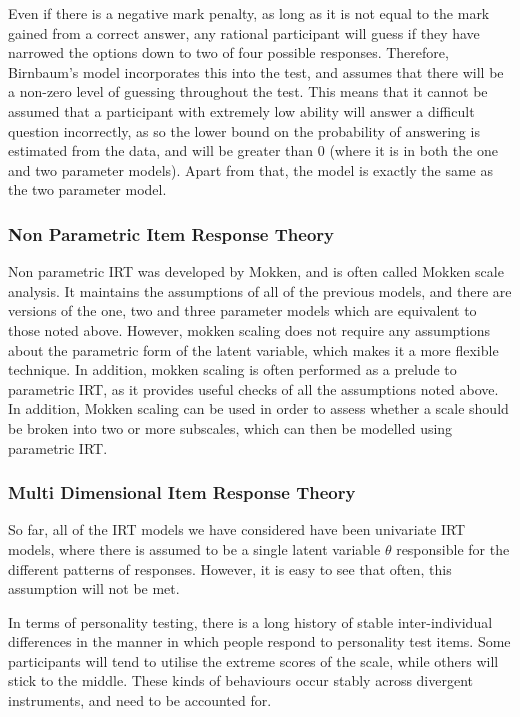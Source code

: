 Even if there is a negative mark penalty, as long as it is not equal to the mark gained from a correct answer, any rational participant will guess if they have narrowed the options down to two of four possible responses. Therefore, Birnbaum's model incorporates this into the test, and assumes that there will be a non-zero level of guessing throughout the test. This means that it cannot be assumed that a participant with extremely low ability will answer a difficult question incorrectly, as so the lower bound on the probability of answering is estimated from the data, and will be greater than 0 (where it is in both the one and two parameter models). Apart from that, the model is exactly the same as the two parameter model.  

\subsubsection{Non Parametric Item Response Theory}

Non parametric IRT was developed by Mokken, and is often called Mokken scale analysis\cite{van2007mokken}. It maintains the assumptions of all of the previous models, and there are versions of the one, two and three parameter models which are equivalent to those noted above. However, mokken scaling does not require any assumptions about the  parametric form of the latent variable, which makes it a more flexible technique. In addition, mokken scaling is often performed as a prelude to parametric IRT, as it provides useful checks of all the assumptions noted above. In addition, Mokken scaling can be used in order to assess whether a scale should be broken into two or more subscales, which can then be modelled using parametric IRT. 

\subsubsection{Multi Dimensional Item Response Theory}

So far, all of the IRT models we have considered have been univariate IRT models, where there is assumed to be a single latent variable $\theta$ responsible for the different patterns of responses. However, it is easy to see that often, this assumption will not be met. 

In terms of personality testing, there is a long history of stable inter-individual differences in the manner in which people respond to personality test items. Some participants will tend to utilise the extreme scores of the scale, while others will stick to the middle. These kinds of behaviours occur stably across divergent instruments, and need to be accounted for. 

